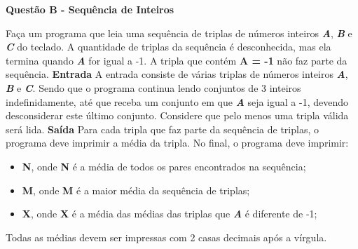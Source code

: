 \documentclass[a4paper, 12pt]{article}
\begin{document}
\newpage %
\begin{center}
\textbf{{\Large Questão B - Sequência de Inteiros}}
\end{center}
\vspace{5pt}
Faça um programa que leia uma sequência de triplas de números inteiros \textbf{\textit{A}}, \textbf{\textit{B}} e \textbf{\textit{C}} do teclado. A quantidade de triplas da sequência é desconhecida, mas ela termina quando \textbf{\textit{A}} for igual a -1. A tripla que contém \textbf{A = -1} não faz parte da sequência.
\newline \newline
\textbf{{\large Entrada}} \newline
A entrada consiste de várias triplas de números inteiros  \textbf{\textit{A}}, \textbf{\textit{B}} e \textbf{\textit{C}}. Sendo que o programa continua lendo conjuntos de 3 inteiros indefinidamente, até que receba um conjunto em que \textbf{\textit{A}} seja igual a -1, devendo desconsiderar este último conjunto. Considere que pelo menos uma tripla válida será lida.
\newline \newline
\textbf{{\large Saída}} \newline
Para cada tripla que faz parte da sequência de triplas, o programa deve imprimir a média da tripla. No final, o programa deve imprimir:
\begin{itemize}
\item \textbf{N}, onde \textbf{N} é a média de todos os pares encontrados na sequência;
\item \textbf{M}, onde \textbf{M} é a maior média da sequência de triplas;
\item \textbf{X}, onde \textbf{X} é a média das médias das triplas que \textbf{\textit{A}} é diferente de -1;
\end{itemize}
Todas as médias devem ser impressas com 2 casas decimais após a vírgula.
\newline
\end{document}
